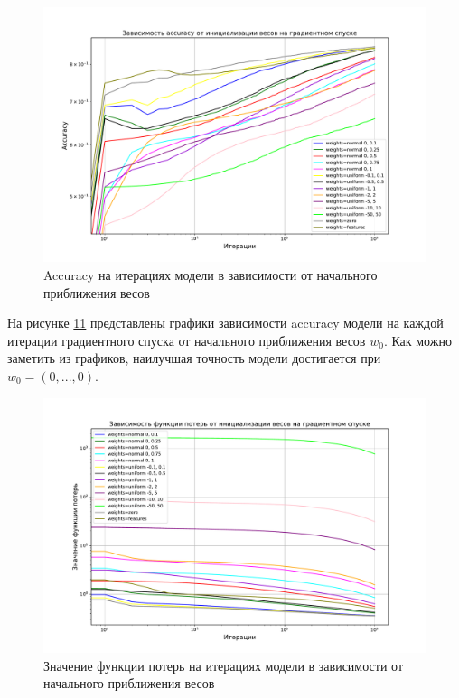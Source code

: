 \documentclass[14pt]{extarticle}
\begin{document}
\begin{figure}[H]
    \centering
    \includegraphics[width=1\linewidth]
    {exp_4_acc_weights.pdf}
    \caption{Accuracy на итерациях модели в зависимости от начального приближения весов}
    \label{fig:exp_4_acc_weights}
\end{figure}

На рисунке \hyperref[fig:exp_4_acc_alpha_1]{11} представлены графики зависимости accuracy модели на каждой итерации градиентного спуска от начального приближения весов \textit{$ w_0 $}. Как можно заметить из графиков, наилучшая точность модели достигается при \textit{$ w_0 = (0, ... , 0)$}.

\begin{figure}[H]
    \centering
    \includegraphics[width=1\linewidth]
    {exp_4_loss_weights.pdf}
    \caption{Значение функции потерь на итерациях модели в зависимости от начального приближения весов}
    \label{fig:exp_4_loss_weights}
\end{figure}
\end{document}
